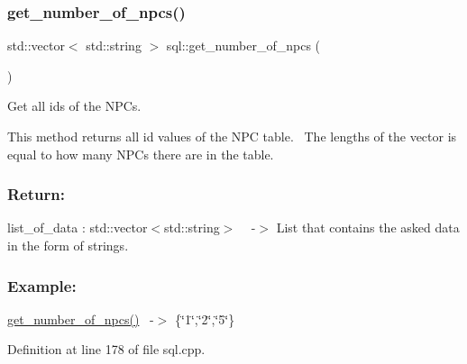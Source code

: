 \subsubsection{\texorpdfstring{get\+\_\+number\+\_\+of\+\_\+npcs()}{get\_number\_of\_npcs()}}
{\footnotesize\ttfamily std\+::vector$<$ std\+::string $>$ sql\+::get\+\_\+number\+\_\+of\+\_\+npcs (\begin{DoxyParamCaption}{ }\end{DoxyParamCaption})}



Get all id\textquotesingle{}s of the N\+PC\textquotesingle{}s. 

This method returns all id values of the N\+PC table.~\newline
The lengths of the vector is equal to how many N\+PC\textquotesingle{}s there are in the table.~\newline


\subsubsection*{Return\+: }

list\+\_\+of\+\_\+data \+: std\+::vector$<$std\+::string$>$ ~\newline
-\/$>$ List that contains the asked data in the form of strings.

\subsubsection*{Example\+: }

\hyperlink{classsql_ae854372bac3fc5e681287e3cbf5b03de}{get\+\_\+number\+\_\+of\+\_\+npcs()}~\newline
-\/$>$ \{\char`\"{}1\char`\"{},\char`\"{}2\char`\"{},\char`\"{}5\char`\"{}\} 

Definition at line 178 of file sql.\+cpp.

